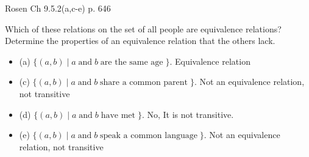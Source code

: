 \begin{questions}
	\ifprintanswers
        \vspace{-5pt}
    \fi
 Rosen Ch 9.5.2(a,c-e) p. 646
    \ifprintanswers
        \vspace{-15pt}
    \fi
    \begin{EnvFullwidth}
    \begin{solution}
    Which of these relations on the set of all people are equivalence relations?  Determine the properties of an equivalence relation that the others lack. 
    \begin{itemize}[itemsep=2pt,parsep=0pt,topsep=0pt,partopsep=0pt]
        \item[] (a) $\{(a,b) \;|\; a \;\text{and}\; b \;\text{are the same age}\;\}$.
          Equivalence relation 
        
       \item[] (c) $\{(a,b) \;|\; a \;\text{and}\; b \;\text{share a common parent}\;\}$.  
       Not an equivalence relation, not transitive
       \item[] (d) $\{(a,b) \;|\; a \;\text{and}\; b \;\text{have met}\;\}$.         
       No, It is not transitive.
       \item[] (e) $\{(a,b) \;|\; a \;\text{and}\; b \;\text{speak a common language}\;\}$. 
       Not an equivalence relation, not transitive 
    \end{itemize}
    \end{solution}
    \end{EnvFullwidth}





\end{questions}
